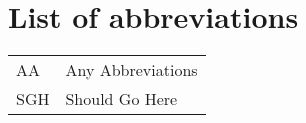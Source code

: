 \chapter*{List of abbreviations}

\begin{table}[htbp]
\begin{center}
\begin{tabular}{ll}

AA  	&	Any Abbreviations		\\
SGH	&	Should Go Here		\\

\end{tabular}
\end{center}
\end{table}%